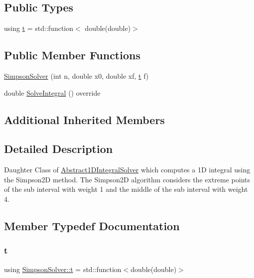 \subsection*{Public Types}
\begin{DoxyCompactItemize}
\item 
using \hyperlink{class_simpson_solver_aa31ea3c884d669836ba1d0399aa53479}{t} = std\+::function$<$ double(double)$>$
\end{DoxyCompactItemize}
\subsection*{Public Member Functions}
\begin{DoxyCompactItemize}
\item 
\hyperlink{class_simpson_solver_abc9059969016bce44332013d48baeed2}{Simpson\+Solver} (int n, double x0, double xf, \hyperlink{class_simpson_solver_aa31ea3c884d669836ba1d0399aa53479}{t} f)
\item 
double \hyperlink{class_simpson_solver_a4843e8bfc0344d9a9cae8688d1114667}{Solve\+Integral} () override
\end{DoxyCompactItemize}
\subsection*{Additional Inherited Members}


\subsection{Detailed Description}
Daughter Class of \hyperlink{class_abstract1_d_integral_solver}{Abstract1\+D\+Integral\+Solver} which computes a 1D integral using the Simpson2D method. The Simpson2D algorithm considers the extreme points of the sub interval with weight 1 and the middle of the sub interval with weight 4. 

\subsection{Member Typedef Documentation}
\mbox{\label{class_simpson_solver_aa31ea3c884d669836ba1d0399aa53479}} 
\subsubsection{\texorpdfstring{t}{t}}
{\footnotesize\ttfamily using \hyperlink{class_simpson_solver_aa31ea3c884d669836ba1d0399aa53479}{Simpson\+Solver\+::t} =  std\+::function$<$double(double)$>$}

